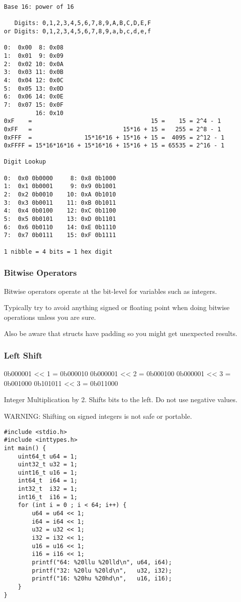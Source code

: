 \documentclass[11pt]{article}
\begin{document}
\begin{verbatim}
Base 16: power of 16

   Digits: 0,1,2,3,4,5,6,7,8,9,A,B,C,D,E,F
or Digits: 0,1,2,3,4,5,6,7,8,9,a,b,c,d,e,f

0:  0x00  8: 0x08
1:  0x01  9: 0x09   
2:  0x02 10: 0x0A  
3:  0x03 11: 0x0B   
4:  0x04 12: 0x0C  
5:  0x05 13: 0x0D  
6:  0x06 14: 0x0E           
7:  0x07 15: 0x0F  
         16: 0x10
0xF    =                                  15 =    15 = 2^4 - 1
0xFF   =                          15*16 + 15 =   255 = 2^8 - 1
0xFFF  =               15*16*16 + 15*16 + 15 =  4095 = 2^12 - 1
0xFFFF = 15*16*16*16 + 15*16*16 + 15*16 + 15 = 65535 = 2^16 - 1

Digit Lookup

0:  0x0 0b0000     8: 0x8 0b1000
1:  0x1 0b0001     9: 0x9 0b1001  
2:  0x2 0b0010    10: 0xA 0b1010 
3:  0x3 0b0011    11: 0xB 0b1011  
4:  0x4 0b0100    12: 0xC 0b1100 
5:  0x5 0b0101    13: 0xD 0b1101 
6:  0x6 0b0110    14: 0xE 0b1110          
7:  0x7 0b0111    15: 0xF 0b1111 

1 nibble = 4 bits = 1 hex digit
\end{verbatim}

\subsubsection{Bitwise Operators}
\label{sec:orgbc7feb2}

Bitwise operators operate at the bit-level for variables such as integers.

Typically try to avoid anything signed or floating point when doing
bitwise operations unless you are sure.

Also be aware that structs have padding so you might get unexpected
results.

\subsubsection{Left Shift}
\label{sec:org389a7dd}

0b000001 << 1 = 0b000010
0b000001 << 2 = 0b000100
0b000001 << 3 = 0b001000
0b101011 << 3 = 0b011000


Integer Multiplication by 2. Shifts bits to the left. Do not use negative values.

WARNING: Shifting on signed integers is not safe or portable.


\begin{verbatim}
#include <stdio.h>
#include <inttypes.h>
int main() {
    uint64_t u64 = 1;
    uint32_t u32 = 1;
    uint16_t u16 = 1;
    int64_t  i64 = 1;
    int32_t  i32 = 1;
    int16_t  i16 = 1;
    for (int i = 0 ; i < 64; i++) {
        u64 = u64 << 1;
        i64 = i64 << 1;
        u32 = u32 << 1;
        i32 = i32 << 1;
        u16 = u16 << 1;
        i16 = i16 << 1;
        printf("64: %20llu %20lld\n", u64, i64);
        printf("32: %20lu %20ld\n",   u32, i32);
        printf("16: %20hu %20hd\n",   u16, i16);
    }
}
\end{verbatim}
\end{document}
